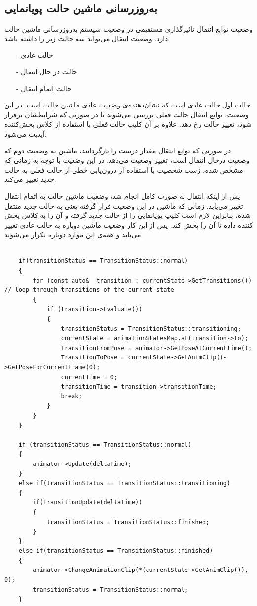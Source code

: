 \subsection{به‌روزرسانی ماشین حالت پویانمایی}

وضعیت توابع انتقال تاثیرگذاری مستقیمی در وضعیت سیستم به‌روزرسانی ماشین حالت دارد.
وضعیت انتقال می‌تواند سه حالت زیر را داشته باشد.

\begin{enumerate}
	\item[-] حالت عادی 
	\item[-] حالت در حال انتقال 
	\item[-] حالت اتمام انتقال 
\end{enumerate}


حالت اول حالت عادی
است که نشان‌دهنده‌ی وضعیت عادی ماشین حالت است. در این وضعیت، توابع انتقال حالت فعلی بررسی می‌شوند تا در صورتی که شرایطشان برقرار شود، تغییر حالت رخ دهد. علاوه بر آن کلیپ حالت فعلی با استفاده از کلاس پخش‌کننده آپدیت می‌شود.

در صورتی که توابع انتقال مقدار درست
را بازگردانند، ماشین به وضعیت دوم که وضعیت درحال انتقال
است، تغییر وضعیت می‌دهد.
در این وضعیت با توجه به زمانی که مشخص شده، ژست شخصیت با استفاده از درون‌یابی خطی از حالت فعلی به حالت جدید تغییر می‌کند.

پس از اینکه انتقال به صورت کامل انجام شد، وضعیت ماشین حالت به اتمام انتقال
تغییر می‌یابد. زمانی که ماشین‌ در این وضعیت قرار گرفته یعنی به حالت جدید منتقل شده، بنابراین لازم است کلیپ پویانمایی را از حالت جدید گرفته و آن را به کلاس پخش کننده داده تا آن را پخش کند.
پس از این کار وضعیت ماشین دوباره به حالت عادی تغییر می‌یابد و همه‌ی این موارد دوباره تکرار می‌شوند.

\begin{latin}
	

\begin{lstlisting}

	if(transitionStatus == TransitionStatus::normal) 
	{
		for (const auto&  transition : currentState->GetTransitions()) // loop through transitions of the current state
		{
			if (transition->Evaluate())
			{
				transitionStatus = TransitionStatus::transitioning;
				currentState = animationStatesMap.at(transition->to);
				TransitionFromPose = animator->GetPoseAtCurrentTime();
				TransitionToPose = currentState->GetAnimClip()->GetPoseForCurrentFrame(0);
				currentTime = 0;
				transitionTime = transition->transitionTime;
				break;
			}
		}
	}

	if (transitionStatus == TransitionStatus::normal)
	{
		animator->Update(deltaTime);
	}
	else if(transitionStatus == TransitionStatus::transitioning)
	{
		if(TransitionUpdate(deltaTime)) 
		{
			transitionStatus = TransitionStatus::finished;
		}
	}
	else if(transitionStatus == TransitionStatus::finished)
	{
		animator->ChangeAnimationClip(*(currentState->GetAnimClip()), 0); 
		transitionStatus = TransitionStatus::normal;
	}
\end{lstlisting}

\end{latin}




